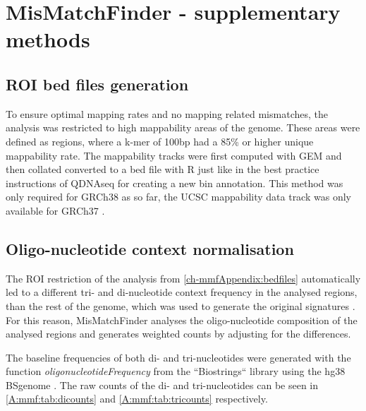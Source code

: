 \chapter[MisMatchFinder - supplementary data]{MisMatchFinder - supplementary methods}
\label{ch-mmfSuppMeth}

\section{ROI bed files generation}
\label{ch-mmfAppendix:bedfiles}

To ensure optimal mapping rates and no mapping related mismatches, the analysis was restricted to high mappability areas of the genome. These areas were defined as regions, where a k-mer of 100bp had a 85\% or higher unique mappability rate. The mappability tracks were first computed with GEM \cite{Derrien2012} and then collated converted to a bed file with R just like in the best practice instructions of QDNAseq \cite{Scheinin2014} for creating a new bin annotation. This method was only required for GRCh38 \cite{Schneider2017} as so far, the UCSC mappability data track was only available for GRCh37 \cite{Church2011}.

\section{Oligo-nucleotide context normalisation}
\label{ch-mmfAppendix:oligoNorm}
The ROI restriction of the analysis from \autoref{ch-mmfAppendix:bedfiles} automatically led to a different tri- and di-nucleotide context frequency in the analysed regions, than the rest of the genome, which was used to generate the original signatures \cite{Alexandrov2020}. For this reason, MisMatchFinder analyses the oligo-nu\-cle\-o\-tide composition of the analysed regions and generates weighted counts by adjusting for the differences. 

The baseline frequencies of both di- and tri-nucleotides were generated with the function \textit{oligonucleotideFrequency} from the ``Biostrings`` library \cite{Pages2020} using the hg38 BSgenome \cite{Pages2020a}. The raw counts of the di- and tri-nucleotides can be seen in \autoref{A:mmf:tab:dicounts} and \autoref{A:mmf:tab:tricounts} respectively.






